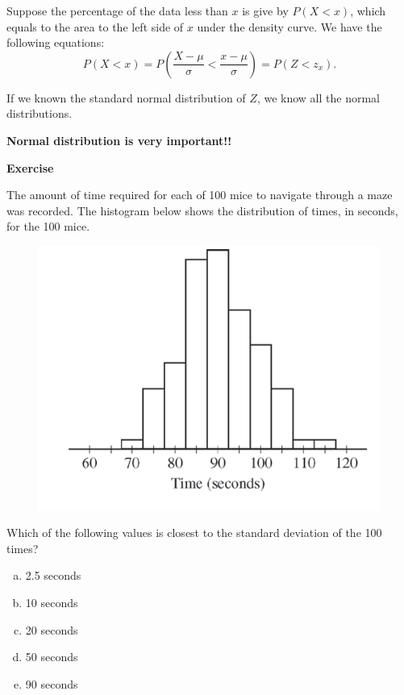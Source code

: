 \documentclass[a4paper, 12pt,twoside]{book}
\begin{document}
\begin{itemize}

Suppose the percentage of the data less than $x$ is give by $P(X<x)$, which equals to the area to the left side of $x$ under the density curve. We have the following equations:
$$P(X<x)= P(\frac{X-\mu}{\sigma}<\frac{x-\mu}{\sigma}) = P(Z<z_x).$$



\colorbox{babypink}{\parbox{14.2cm}{If we known the standard normal distribution of $Z$, we know all the normal distributions.}}
\end{itemize}
\vspace{0.6cm}

 \begin{center}
\textbf{\Large{Normal distribution is very important!!}}
\end{center}
\newpage

\colorbox{champagne}{\begin{minipage}{\textwidth}
\textbf{Exercise}

The amount of time required for each of 100 mice to navigate through a maze was recorded. The histogram below shows the distribution of times, in seconds, for the 100 mice.
\begin{figure}[H]
\centering
\includegraphics[scale=0.6]{Exercise1.png}
\end{figure}
 Which of the following values is closest to the standard deviation of the 100 times? 
 \begin{enumerate}[(a), start =1]
 \item 2.5 seconds
 \item 10 seconds
 \item 20 seconds
 \item 50 seconds
 \item 90 seconds
 \end{enumerate}
 \end{minipage}
 }
\vspace{0.6cm}
\end{document}
